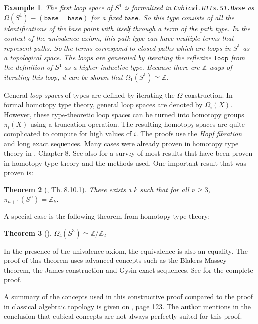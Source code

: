 \documentclass[12pt,a4paper,twoside,xetex]{book} %
\newcommand{\keyword}[1]{\emph{#1}\index{#1}}
\newtheorem{theorem}{Theorem}[section]
\newtheorem{example}[theorem]{Example}
\newcommand{\op}[1]{\mathtt{#1}}
\begin{document}
\begin{example}
The first loop space of $S^1$ is formalized in \texttt{Cubical.HITs.S1.Base} 
as $\Omega (S^1) \equiv (\op{base} = \op{base})$ for a fixed
$\op{base}$. So this type consists of all the identifications of the base 
point with itself through a term of the path type. In the context of the 
univalence axiom, this path type can have multiple terms that represent paths. 
So the terms correspond to closed paths which are loops in $S^1$ as a 
topological space. The loops are generated by iterating the reflexive 
$\op{loop}$ from the definition of $S^1$ as a higher inductive type. Because 
there are $\mathbb{Z}$ ways of iterating this loop, it can be shown that 
$\Omega_1 (S^1) \simeq \mathbb{Z}$. 
\end{example}


General \keyword{loop spaces} of types 
are defined by iterating the $\Omega$ construction. In formal homotopy type 
theory, general loop spaces are denoted by $\Omega_i (X)$. However, these type-theoretic loop spaces can be turned into homotopy groups $\pi_i(X)$ using a truncation operation. 
The resulting homotopy spaces are quite complicated to compute for high values of $i$. The proofs use the \keyword{Hopf fibration} and long exact sequences. Many cases were already proven in homotopy type theory in \cite{Voevodsky2013}, Chapter 8. See also \cite{Licata2013May} for a survey of most results that have been proven in 
homotopy type theory and the methods used. One important result that was proven 
is:

\begin{theorem}[\cite{Voevodsky2013}, Th. 8.10.1]
 There exists a $k$ such that for all $n \geq 3$, $\pi_{n+1}(S^n) = 
\mathbb{Z}_k$.
\end{theorem}

A special case is the following theorem from homotopy type theory:

\begin{theorem}[\cite{Brunerie2016}]
$\Omega_4 ( S^3 ) \simeq \mathbb{Z} / \mathbb{Z}_2$
\end{theorem}

In the presence of the univalence axiom, the equivalence is also an equality. The proof of this theorem uses advanced concepts such as the Blakers-Massey 
theorem, the James construction and Gysin exact sequences. See 
\cite{Brunerie2016} for the complete proof.

A summary of the concepts used in this constructive proof compared to the proof 
in classical algebraic topology is given on \cite{Brunerie2016}, page 123. The 
author mentions in the conclusion that cubical concepts are not always perfectly 
suited for this proof. 
\end{document}
